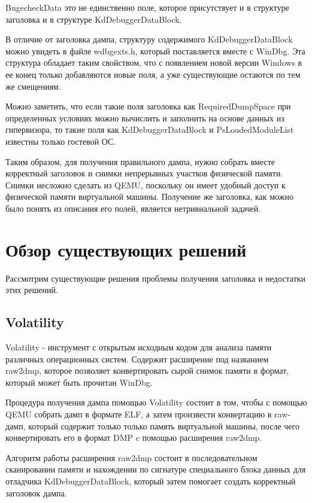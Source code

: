 \documentclass{mipt-thesis-bs}
\begin{document}
BugecheckData это не единственно поле, которое присутствует и в структуре заголовка и в структуре KdDebuggerDataBlock.

В отличие от заголовка дампа, структуру содержимого KdDebuggerDataBlock можно увидеть в файле wdbgexts.h, который поставляется вместе с WinDbg. Эта структура обладает таким свойством, что с появлением новой версии Windows в ее конец только добавляются новые поля, а уже существующие остаются по тем же смещениям.

Можно заметить, что если такие поля заголовка как RequiredDumpSpace при определенных условиях можно вычислить и заполнить на основе данных из гипервизора, то такие поля как KdDebuggerDataBlock и PsLoadedModuleList известны только гостевой ОС.

Таким образом, для получения правильного дампа, нужно собрать вместе корректный заголовок и снимки непрерывных участков физической памяти. Снимки несложно сделать из QEMU, поскольку он имеет удобный доступ к физической памяти виртуальной машины. Получение же заголовка, как можно было понять из описания его полей, является нетривиальной задачей.

\chapter{Обзор существующих решений}

Рассмотрим существующие решения проблемы получения заголовка и недостатки этих решений.

\section*{Volatility}

Volatility - инструмент с открытым исходным кодом для анализа памяти различных операционных систем. Содержит расширение под названием raw2dmp, которое позволяет конвертировать сырой снимок памяти в формат, который может быть прочитан WinDbg.

Процедура получения дампа помощью Volatility состоит в том, чтобы с помощью QEMU собрать дамп в формате ELF, а затем произвести конвертацию в raw-дамп, который содержит только только память виртуальной машины, после чего конвертировать его в формат DMP c помощью расширения raw2dmp.

Алгоритм работы расширения raw2dmp состоит в последовательном сканировании памяти и нахождении по сигнатуре специального блока данных для отладчика KdDebuggerDataBlock, который затем помогает создать корректный заголовок дампа.
\end{document}
